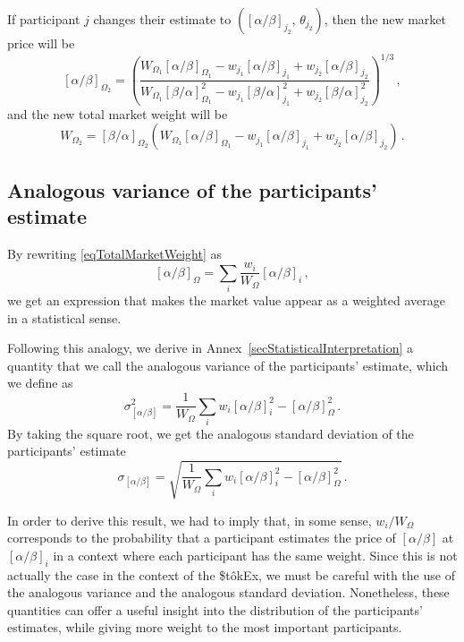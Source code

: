 \documentclass[letterpaper]{article}
\newcommand{\priceAB}{\left[\alpha / \beta\right]}
\newcommand{\priceBA}{\left[\beta / \alpha\right]}
\newcommand{\StokEx}{\$t\^{o}kEx}
\begin{document}
If participant $j$ changes their estimate to $(\priceAB_{j_2},\, \theta_{j_2})$, then the new market price will be
\begin{equation}
    \priceAB_{\Omega_2} = \left( \frac{W_{\Omega_1}\priceAB_{\Omega_1} - w_{j_1} \priceAB_{j_1} + w_{j_2} \priceAB_{j_2}}{W_{\Omega_1} \priceBA_{\Omega_1}^2 - w_{j_1}\priceBA_{j_1}^2 + w_{j_2}\priceBA_{j_2}^2}\right)^{1/3} \, ,
\end{equation}
and the new total market weight will be
\begin{equation}
    W_{\Omega_2} = \priceBA_{\Omega_2} \left( W_{\Omega_1}\priceAB_{\Omega_1} - w_{j_1} \priceAB_{j_1} + w_{j_2} \priceAB_{j_2} \right) \, .
\end{equation}

\subsection{Analogous variance of the participants' estimate}

By rewriting \eqref{eqTotalMarketWeight} as
\begin{equation}
    \priceAB_\Omega = \sum_i \frac{w_i}{W_\Omega} \priceAB_i\,,
\end{equation}
we get an expression that makes the market value appear as a weighted average in a statistical sense.

Following this analogy, we derive in Annex~\ref{secStatisticalInterpretation} a quantity that we call the analogous variance of the participants' estimate, which we define as
\begin{equation}
    \sigma_{\priceAB}^2 = \frac{1}{W_\Omega} \sum_i w_i \priceAB_i^2 - \priceAB_\Omega^2\,.
\end{equation}
By taking the square root, we get the analogous standard deviation of the participants' estimate
\begin{equation}
    \sigma_{\priceAB} = \sqrt{\frac{1}{W_\Omega} \sum_i w_i \priceAB_i^2 - \priceAB_\Omega^2}\,.
\end{equation}

In order to derive this result, we had to imply that, in some sense, $w_i/W_\Omega$ corresponds to the probability that a participant estimates the price of $\priceAB$ at $\priceAB_i$ in a context where each participant has the same weight. Since this is not actually the case in the context of the \StokEx{}, we must be careful with the use of the analogous variance and the analogous standard deviation. Nonetheless, these quantities can offer a useful insight into the distribution of the participants' estimates, while giving more weight to the most important participants.
\end{document}
